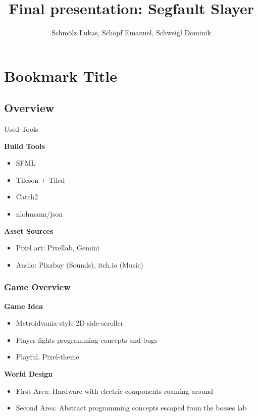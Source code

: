 \documentclass[11pt,t,usepdftitle=false,aspectratio=169]{beamer}
\title[]{Final presentation: Segfault Slayer}
\author[Schmölz Lukas, Schöpf Emanuel, Schweigl Dominik]{Schmölz Lukas, Schöpf Emanuel, Schweigl Dominik}
\begin{document}
\section{Bookmark Title}
\subsection{Overview}


\begin{frame}{Used Tools}

	\small
	\textbf{Build Tools}
	\begin{itemize}
		\item SFML
		\item Tileson + Tiled
		\item Catch2
		\item nlohmann/json
	\end{itemize}

	\bigskip

	\textbf{Asset Sources}
	\begin{itemize}
		\item Pixel art: Pixellab, Gemini
		\item Audio: Pixabay (Sounds), itch.io (Music)
	\end{itemize}
\end{frame}

\begin{frame}
	\frametitle{Game Overview}

	\small
	\textbf{Game Idea}
	\begin{itemize}
		\item Metroidvania-style 2D side-scroller
		\item Player fights programming concepts and bugs
		\item Playful, Pixel-theme
	\end{itemize}

	\bigskip

	\textbf{World Design}
	\begin{itemize}
		\item First Area: Hardware with electric components roaming around
		\item Second Area: Abstract programming concepts escaped from the bosses lab
	\end{itemize}
\end{frame}
\end{document}
